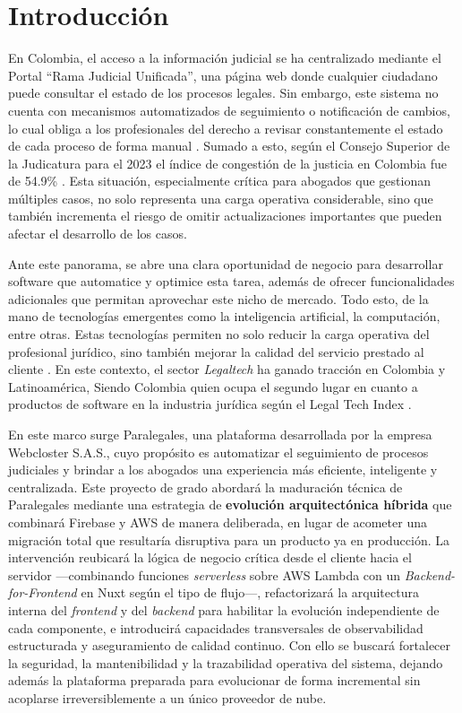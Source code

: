 \section{Introducción}

En Colombia, el acceso a la información judicial se ha centralizado mediante el Portal  “Rama Judicial Unificada”, una página web donde cualquier ciudadano puede consultar el estado de los procesos legales. Sin embargo, este sistema no cuenta con mecanismos automatizados de seguimiento o notificación de cambios, lo cual obliga a los profesionales del derecho a revisar constantemente el estado de cada proceso de forma manual \cite{Paez2024}. Sumado a esto,  según el Consejo Superior de la Judicatura para el 2023 el índice de congestión de la justicia en Colombia fue de 54.9\% \cite{Rozo2024}. Esta situación, especialmente crítica para abogados que gestionan múltiples casos, no solo representa una carga operativa considerable, sino que también incrementa el riesgo de omitir actualizaciones importantes que pueden afectar el desarrollo de los casos.

Ante este panorama, se abre una clara oportunidad de negocio para desarrollar software que automatice y optimice esta tarea, además de ofrecer funcionalidades adicionales que permitan aprovechar este nicho de mercado. Todo esto, de la mano de tecnologías emergentes como la inteligencia artificial, la computación, entre otras. Estas tecnologías permiten no solo reducir la carga operativa del profesional jurídico, sino también mejorar la calidad del servicio prestado al cliente \cite{Botero2023}. En este contexto, el sector \textit{Legaltech} ha ganado tracción en Colombia y Latinoamérica, Siendo Colombia quien ocupa el segundo lugar en cuanto a productos de software en la industria jurídica según el Legal Tech Index \cite{Sierra2023}.

En este marco surge Paralegales, una plataforma desarrollada por la empresa Webcloster S.A.S., cuyo propósito es automatizar el seguimiento de procesos judiciales y brindar a los abogados una experiencia más eficiente, inteligente y centralizada. Este proyecto de grado abordará la maduración técnica de Paralegales mediante una estrategia de \textbf{evolución arquitectónica híbrida} que combinará Firebase y AWS de manera deliberada, en lugar de acometer una migración total que resultaría disruptiva para un producto ya en producción. La intervención reubicará la lógica de negocio crítica desde el cliente hacia el servidor —combinando funciones \textit{serverless} sobre AWS Lambda con un \textit{Backend-for-Frontend} en Nuxt según el tipo de flujo—, refactorizará la arquitectura interna del \textit{frontend} y del \textit{backend} para habilitar la evolución independiente de cada componente, e introducirá capacidades transversales de observabilidad estructurada y aseguramiento de calidad continuo. Con ello se buscará fortalecer la seguridad, la mantenibilidad y la trazabilidad operativa del sistema, dejando además la plataforma preparada para evolucionar de forma incremental sin acoplarse irreversiblemente a un único proveedor de nube.
